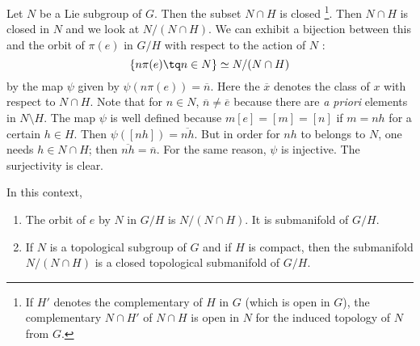 Let $N$ be a Lie subgroup of $G$. Then the subset $N\cap H$ is closed
\footnote{If $H'$ denotes the complementary of $H$ in $G$ (which is open in $G$), the complementary $N\cap H'$ of $N\cap H$ is open in $N$ for the induced topology of $N$ from $G$.}. Then $N\cap H$ is closed in $N$ and we look at $N/(N\cap H)$. We can exhibit a bijection between this and the orbit of $\pi(e)$ in $G/H$ with respect to the action of $N$ :
\begin{equation}
  \{ n\pi(e)\tq n\in N \}\simeq N/(N\cap H)
\end{equation}
by the map $\psi$ given by $\psi(n\pi(e))=\overline{n}$. Here the $\overline{ x }$ denotes the class of $x$ with respect to $N\cap H$. Note that for $n\in N$, $\overline{n}\neq\overline{e}$ because there are \emph{a priori} elements in $N\setminus H$. The map $\psi$ is well defined because $m[e]=[m]=[n]$ if $m=nh$ for a certain $h\in H$. Then $\psi([nh])=\overline{nh}$. But in order for $nh$ to belongs to $N$, one needs $h\in N\cap H$; then $\overline{nh}=\overline{n}$. For the same reason, $\psi$ is injective. The surjectivity is clear.

\begin{proposition}			\label{prop:orbit_N_ss_var}
	In this context,
	\begin{enumerate}
		\item The orbit of $e$ by $N$ in $G/H$ is $N/(N\cap H)$. It is submanifold of $G/H$.
		\item If $N$ is a topological subgroup of $G$ and if $H$ is compact, then the submanifold $N/(N\cap H)$ is a closed topological submanifold of $G/H$.
	\end{enumerate}
\end{proposition}

